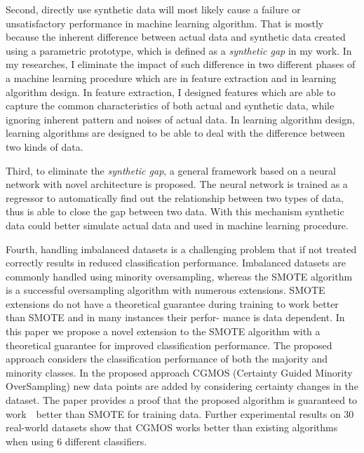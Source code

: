 \documentclass{iitthesis}
\begin{document}
Second, directly use synthetic data will most likely cause a failure or unsatisfactory performance in machine learning algorithm. That is mostly because the inherent difference between actual data and synthetic data created using a parametric prototype, which is defined as a \textit{synthetic gap} in my work. In my researches, I eliminate the impact of such difference in two different phases of a machine learning procedure which are in feature extraction and in learning algorithm design. In feature extraction, I designed features which are able to capture the common characteristics of both actual and synthetic data, while ignoring inherent pattern and noises of actual data. In learning algorithm design, learning algorithms are designed to be able to deal with the difference between two kinds of data. 

Third, to eliminate the \textit{synthetic gap}, a general framework based on a neural network with novel architecture is proposed. The neural network is trained as a regressor to automatically find out the relationship between two types of data, thus is able to close the gap between two data. With this mechanism synthetic data could better simulate actual data and used in machine learning procedure.

Fourth, handling imbalanced datasets is a challenging problem that if not treated correctly results in reduced classification performance. Imbalanced datasets are commonly handled using minority oversampling, whereas the SMOTE algorithm is a successful oversampling algorithm with numerous extensions. SMOTE extensions do not have a theoretical guarantee during training to work better than SMOTE and in many instances their perfor- mance is data dependent. In this paper we propose a novel extension to the SMOTE algorithm with a theoretical guarantee for improved classification performance. The proposed approach considers the classification performance of both the majority and
minority classes. In the proposed approach CGMOS (Certainty Guided Minority OverSampling) new data points are added by considering certainty changes in the dataset. The paper provides a proof that the proposed algorithm is guaranteed to work　better than SMOTE for training data. Further experimental results on 30 real-world datasets show
that CGMOS works better than existing algorithms when using 6 different classifiers.
\clearpage


%
%
%
%
%
%
%
%
%


 

\end{document}
